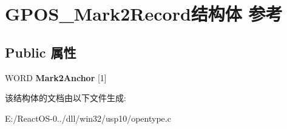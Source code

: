 \hypertarget{struct_g_p_o_s___mark2_record}{}\section{G\+P\+O\+S\+\_\+\+Mark2\+Record结构体 参考}
\label{struct_g_p_o_s___mark2_record}
\subsection*{Public 属性}
\begin{DoxyCompactItemize}
\item 
\mbox{\label{struct_g_p_o_s___mark2_record_a8aa7a7efba91c2ec0e1a5dd1110a85d9}} 
W\+O\+RD {\bfseries Mark2\+Anchor} \mbox{[}1\mbox{]}
\end{DoxyCompactItemize}


该结构体的文档由以下文件生成\+:\begin{DoxyCompactItemize}
\item 
E\+:/\+React\+O\+S-\/0../dll/win32/usp10/opentype.\+c\end{DoxyCompactItemize}
